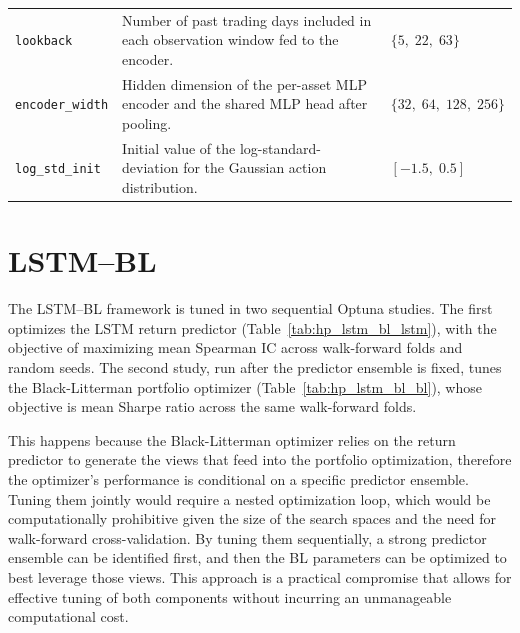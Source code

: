 \begin{longtable}{@{}p{3.7cm} p{7.5cm} p{3.3cm}@{}}
\texttt{lookback} & Number of past trading days included in each observation window fed to the encoder. & $\{5,\;22,\;63\}$ \\[4pt]
 
\texttt{encoder\_width} & Hidden dimension of the per-asset MLP encoder and the shared MLP head after pooling. & $\{32,\;64,\;128,\;256\}$ \\[4pt]
 
\texttt{log\_std\_init} & Initial value of the log-standard-deviation for the Gaussian action distribution. & $[-1.5,\;0.5]$ \\[6pt]

\bottomrule
\end{longtable}

\section{LSTM--BL}

The LSTM--BL framework is tuned in two sequential Optuna studies. The first optimizes the LSTM return predictor (Table~\ref{tab:hp_lstm_bl_lstm}), with the objective of maximizing mean Spearman IC across walk-forward folds and random seeds. The second study, run after the predictor ensemble is fixed, tunes the Black-Litterman portfolio optimizer (Table~\ref{tab:hp_lstm_bl_bl}), whose objective is mean Sharpe ratio across the same walk-forward folds.

This happens because the Black-Litterman optimizer relies on the return predictor to generate the views that feed into the portfolio optimization, therefore the optimizer's performance is conditional on a specific predictor ensemble. Tuning them jointly would require a nested optimization loop, which would be computationally prohibitive given the size of the search spaces and the need for walk-forward cross-validation. By tuning them sequentially, a strong predictor ensemble can be identified first, and then the BL parameters can be optimized to best leverage those views. This approach is a practical compromise that allows for effective tuning of both components without incurring an unmanageable computational cost.

